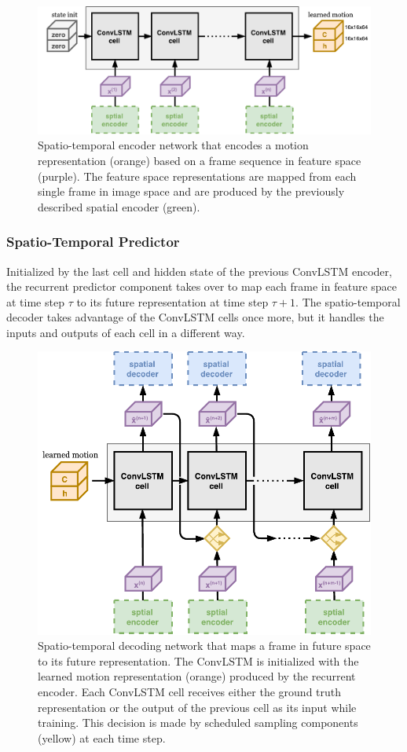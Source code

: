 \begin{figure}[htb]
	\centering
	\includegraphics[width=0.9\linewidth]{figures/comp_spatiotemp_encoder.pdf} 
	\caption[Spatio-Temporal Encoding Component]{Spatio-temporal encoder network that encodes a motion representation (orange) based on a frame sequence in feature space (purple). The feature space representations are mapped from each single frame in image space and are produced by the previously described spatial encoder (green).} \label{fig:comp-spatiotemp_encoder}
\end{figure}

\subsubsection{Spatio-Temporal Predictor}

Initialized by the last cell and hidden state of the previous ConvLSTM encoder, the recurrent predictor component takes over to map each frame in feature space at time step $\tau$ to its future representation at time step $\tau + 1$. The spatio-temporal decoder takes advantage of the ConvLSTM cells once more, but it handles the inputs and outputs of each cell in a different way.

\begin{figure}[htb]
	\centering
	\includegraphics[width=0.8\linewidth]{figures/comp_spatiotemp_decoder.pdf} 
	\caption[Spatio-Temporal Predictor Component]{Spatio-temporal decoding network that maps a frame in future space to its future representation. The ConvLSTM is initialized with the learned motion representation (orange) produced by the recurrent encoder. Each ConvLSTM cell receives either the ground truth representation or the output of the previous cell as its input while training. This decision is made by scheduled sampling components (yellow) at each time step.} \label{fig:comp-spatiotemp_predictor}
\end{figure}

